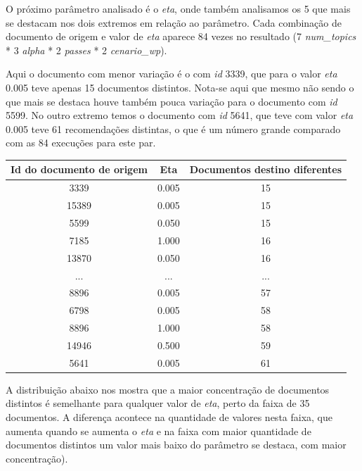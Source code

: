 O próximo parâmetro analisado é o \textit{eta}, onde também analisamos os 5 que mais se destacam nos dois extremos em relação ao parâmetro.
Cada combinação de documento de origem e valor de \textit{eta} aparece 84 vezes no resultado (7 \textit{num\_topics} * 3 \textit{alpha} * 2 \textit{passes} * 2 \textit{cenario\_wp}).

Aqui o documento com menor variação é o com \textit{id} 3339, que para o valor \textit{eta} 0.005 teve apenas 15 documentos distintos. Nota-se aqui
que mesmo não sendo o que mais se destaca houve também pouca variação para o documento com \textit{id} 5599.
No outro extremo temos o documento com \textit{id} 5641, que teve com valor \textit{eta} 0.005 teve 61 recomendações distintas, o que é um número 
grande comparado com as 84 execuções para este par.

\begin{center}
    \begin{tabular}{|c|c|c|}
        \hline
        \textbf{Id do documento de origem} & \textbf{Eta} & \textbf{Documentos destino diferentes} \\
        \hline
        3339 & 0.005 & 15 \\
        \hline
        15389 & 0.005 & 15 \\
        \hline
        5599 & 0.050 & 15 \\
        \hline
        7185 & 1.000 & 16 \\
        \hline
        13870 & 0.050 & 16 \\
        \hline
        ... & ... & ... \\
        \hline
        8896 & 0.005 & 57 \\
        \hline
        6798 & 0.005 & 58 \\
        \hline
        8896 & 1.000 & 58 \\
        \hline
        14946 & 0.500 & 59 \\
        \hline
        5641 & 0.005 & 61 \\
        \hline
    \end{tabular}
\end{center}

A distribuição abaixo nos mostra que a maior concentração de documentos distintos é semelhante para qualquer valor de \textit{eta}, perto da faixa de 
35 documentos. A diferença acontece na quantidade de valores nesta faixa, que aumenta quando se aumenta o \textit{eta} e na faixa com maior 
quantidade de documentos distintos um valor mais baixo do parâmetro se destaca, com maior concentração).

